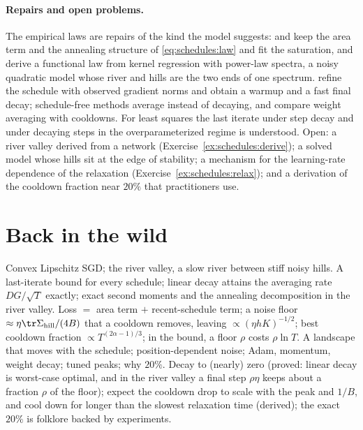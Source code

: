 \begin{refsection}
\paragraph{Repairs and open problems.} The empirical laws are repairs of the kind the model suggests: \textcite{TissueEtAl2025} and \textcite{LuoEtAl2025} keep the area term and the annealing structure of \eqref{eq:schedules:law} and fit the saturation, and \textcite{LiEtAl2025} derive a functional law from kernel regression with power-law spectra, a noisy quadratic model whose river and hills are the two ends of one spectrum. \Textcite{DefazioEtAl2023} refine the schedule with observed gradient norms and obtain a warmup and a fast final decay; schedule-free methods \parencite{DefazioEtAl2024} average instead of decaying, and \textcite{HageleEtAl2024} compare weight averaging with cooldowns. For least squares the last iterate under step decay \parencite{GeEtAl2019} and under decaying steps in the overparameterized regime \parencite{WuEtAl2022} is understood. Open: a river valley derived from a network (Exercise~\ref{ex:schedules:derive}); a solved model whose hills sit at the edge of stability; a mechanism for the learning-rate dependence of the relaxation (Exercise~\ref{ex:schedules:relax}); and a derivation of the cooldown fraction near $20\%$ that practitioners use.

\section{Back in the wild}\label{sec:schedules:back}

{Convex Lipschitz SGD; the river valley, a slow river between stiff noisy hills.}
{A last-iterate bound for every schedule; linear decay attains the averaging rate $DG/\sqrt T$ exactly; exact second moments and the annealing decomposition in the river valley.}
{Loss $=$ area term $+$ recent-schedule term; a noise floor $\approx\eta\tr\Sigma_{\mathrm{hill}}/(4B)$ that a cooldown removes, leaving $\propto(\eta hK)^{-1/2}$; best cooldown fraction $\propto T^{(2\alpha-1)/3}$; in the bound, a floor $\rho$ costs $\rho\ln T$.}
{A landscape that moves with the schedule; position-dependent noise; Adam, momentum, weight decay; tuned peaks; why $20\%$.}
{Decay to (nearly) zero (proved: linear decay is worst-case optimal, and in the river valley a final step $\rho\eta$ keeps about a fraction $\rho$ of the floor); expect the cooldown drop to scale with the peak and $1/B$, and cool down for longer than the slowest relaxation time (derived); the exact $20\%$ is folklore backed by experiments.}


\end{refsection}
